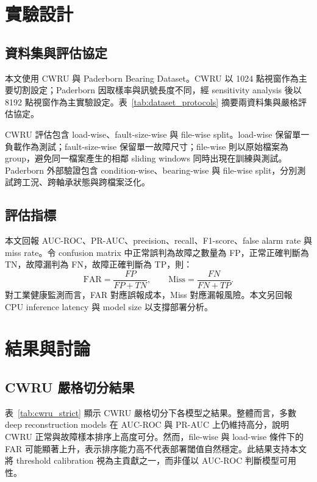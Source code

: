 \documentclass[sn-mathphys-num]{sn-jnl}
\newcommand{\aucroc}{AUC\mbox{-}ROC}
\newcommand{\prauc}{PR\mbox{-}AUC}
\begin{document}
\section{實驗設計}
\label{sec:experiment}

\subsection{資料集與評估協定}

本文使用 CWRU 與 Paderborn Bearing Dataset。CWRU 以 1024 點視窗作為主要切割設定；Paderborn 因取樣率與訊號長度不同，經 sensitivity analysis 後以 8192 點視窗作為主實驗設定。表~\ref{tab:dataset_protocols} 摘要兩資料集與嚴格評估協定。



CWRU 評估包含 load-wise、fault-size-wise 與 file-wise split。load-wise 保留單一負載作為測試；fault-size-wise 保留單一故障尺寸；file-wise 則以原始檔案為 group，避免同一檔案產生的相鄰 sliding windows 同時出現在訓練與測試。Paderborn 外部驗證包含 condition-wise、bearing-wise 與 file-wise split，分別測試跨工況、跨軸承狀態與跨檔案泛化。

\subsection{評估指標}

本文回報 \aucroc{}、\prauc{}、precision、recall、F1-score、false alarm rate 與 miss rate。令 confusion matrix 中正常誤判為故障之數量為 FP，正常正確判斷為 TN，故障漏判為 FN，故障正確判斷為 TP，則：
\begin{equation}
\mathrm{FAR}=\frac{FP}{FP+TN}, \qquad
\mathrm{Miss}=\frac{FN}{FN+TP}.
\end{equation}
對工業健康監測而言，FAR 對應誤報成本，Miss 對應漏報風險。本文另回報 CPU inference latency 與 model size 以支撐部署分析。

\section{結果與討論}
\label{sec:results}

\subsection{CWRU 嚴格切分結果}

表~\ref{tab:cwru_strict} 顯示 CWRU 嚴格切分下各模型之結果。整體而言，多數 deep reconstruction models 在 \aucroc{} 與 \prauc{} 上仍維持高分，說明 CWRU 正常與故障樣本排序上高度可分。然而，file-wise 與 load-wise 條件下的 FAR 可能顯著上升，表示排序能力高不代表部署閾值自然穩定。此結果支持本文將 threshold calibration 視為主貢獻之一，而非僅以 \aucroc{} 判斷模型可用性。
\end{document}
